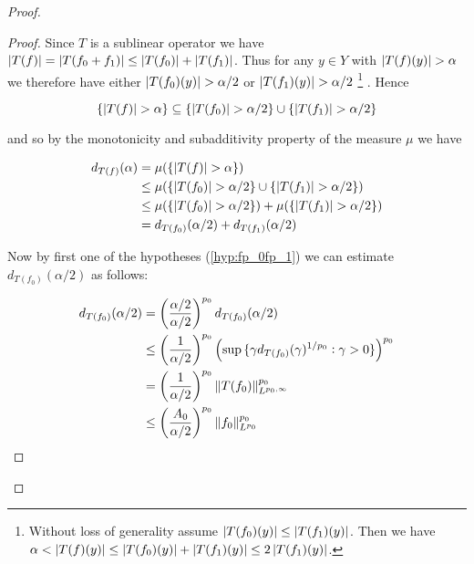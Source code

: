 \begin{proof}
\begin{proof}
	Since $T$ is a sublinear operator we have $\abs[0]{ T(f)} = \abs[0]{ T(f_0 + f_1)} \leq \abs[0]{ T(f_0)} + \abs[0]{ T(f_1)}$. Thus for any $y \in Y$ with $\abs[0]{ T(f)(y)} > \alpha$ we therefore have either $\abs[0]{ T(f_0)(y)} > \alpha/2$ or $\abs[0]{ T(f_1)(y) } > \alpha/2$ 
	\footnote{Without loss of generality assume $\abs[0]{ T(f_0)(y) } \leq \abs[0]{ T(f_1)(y)} $. Then we have $\alpha < \abs[0]{ T(f)(y)} \leq \abs[0]{ T(f_0)(y) } + \abs[0]{ T(f_1)(y)} \leq 2\abs[0]{ T(f_1)(y)}$.}
		. Hence

\begin{equation*}
	\cbr[0]{\abs[0]{ T(f)} > \alpha } \subseteq \cbr[0]{\abs[0]{ T(f_0) } > \alpha/2 } \cup \cbr[0]{\abs[0]{ T(f_1)} > \alpha/2 }
\end{equation*}

\noindent and so by the monotonicity and subadditivity property of the measure $\mu$ we have

\begin{equation*}
	\begin{aligned}
		d_{T(f)}(\alpha) &= \mu(\cbr[0]{\abs[0]{ T(f)} > \alpha})\\
		&\leq \mu(\cbr[0]{\abs[0]{ T(f_0)} > \alpha/2 } \cup \cbr[0]{\abs[0]{ T(f_1)} > \alpha/2 })\\
		&\leq \mu(\cbr[0]{\abs[0]{ T(f_0) } > \alpha/2 }) + \mu(\cbr[0]{\abs[0]{ T(f_1)} > \alpha/2 })\\
		&= d_{T(f_0)}(\alpha/2) + d_{T(f_1)}(\alpha/2)
		\label{est:T}
	\end{aligned}
\end{equation*}

Now by first one of the hypotheses (\ref{hyp:fp_0fp_1}) we can estimate $d_{T(f_0)}(\alpha/2)$ as follows:

\begin{equation*}
	\begin{aligned}
		d_{T(f_0)}(\alpha/2) &= \del{\frac{\alpha/2}{\alpha/2}}^{p_0} d_{T(f_0)}(\alpha/2)\\
		&\leq \del{\frac{1}{\alpha/2}}^{p_0} \del{\sup\cbr[0]{ \gamma d_{T(f_0)}(\gamma)^{1/p_0}: \gamma > 0}}^{p_0}\\
		& = \del{\frac{1}{\alpha/2}}^{p_0} \norm[0]{T(f_0)}^{p_0}_{L^{p_0,\infty}}\\
		& \leq \del{\frac{A_0}{\alpha/2}}^{p_0} \norm[0]{f_0}^{p_0}_{L^{p_0}}
	\label{est:p_0}
	\end{aligned}
\end{equation*}


\end{proof}
\end{proof}
